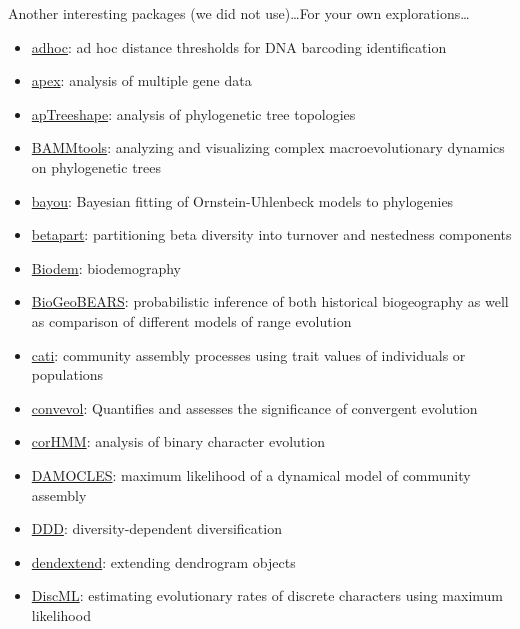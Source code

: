 \documentclass[compress, ucs, xelatex, 11pt, xcolor=svgnames,
  hyperref={
    bookmarks=true,
    unicode=true,
    colorlinks=true,
    pdftitle={Molecular data in R},
    plainpages=false,
    pdfauthor={Vojtech Zeisek},
    pdfsubject={Course about phylogeny and evolution in R},
    pdfcreator={XeLaTeX},
    pdfkeywords={R, evolution, phylogeny, molecular data},
    linkcolor=Tomato,
    anchorcolor=SaddleBrown,
    citecolor=Goldenrod,
    filecolor=DarkMagenta,
    menucolor=Sienna,
    urlcolor=DarkTurquoise,
    pdftex},
  url={hyphens, lowtilde} %
  ]{beamer}
\begin{document}
\begin{frame}[allowframebreaks]{Another interesting packages (we did not use)\ldots}{For your own explorations\ldots}
  \begin{itemize}
    \item \href{https://cran.r-project.org/package=adhoc}{adhoc}: ad hoc distance thresholds for DNA barcoding identification
    \item \href{https://cran.r-project.org/package=apex}{apex}: analysis of multiple gene data
    \item \href{https://cran.r-project.org/package=apTreeshape}{apTreeshape}: analysis of phylogenetic tree topologies
    \item \href{https://cran.r-project.org/package=BAMMtools}{BAMMtools}: analyzing and visualizing complex macroevolutionary dynamics on phylogenetic trees
    \item \href{https://cran.r-project.org/package=bayou}{bayou}: Bayesian fitting of Ornstein-Uhlenbeck models to phylogenies
    \item \href{https://cran.r-project.org/package=betapart}{betapart}: partitioning beta diversity into turnover and nestedness components
    \item \href{https://cran.r-project.org/package=Biodem}{Biodem}: biodemography
    \item \href{https://cran.r-project.org/package=BioGeoBEARS}{BioGeoBEARS}: probabilistic inference of both historical biogeography as well as comparison of different models of range evolution
    \item \href{https://cran.r-project.org/package=cati}{cati}: community assembly processes using trait values of individuals or populations
    \item \href{https://cran.r-project.org/package=convevol}{convevol}: Quantifies and assesses the significance of convergent evolution
    \item \href{https://cran.r-project.org/package=corHMM}{corHMM}: analysis of binary character evolution
    \item \href{https://cran.r-project.org/package=DAMOCLES}{DAMOCLES}: maximum likelihood of a dynamical model of community assembly
    \item \href{https://cran.r-project.org/package=DDD}{DDD}: diversity-dependent diversification
    \item \href{https://cran.r-project.org/package=dendextend}{dendextend}: extending dendrogram objects
    \item \href{https://cran.r-project.org/package=DiscML}{DiscML}: estimating evolutionary rates of discrete characters using maximum likelihood

\end{itemize}
\end{frame}
\end{document}
